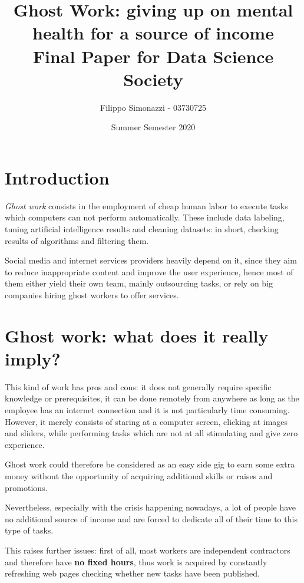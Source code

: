 \documentclass[12pt]{article}
\title{\textbf{Ghost Work: giving up on mental health for a source of income}  \\[0.4em] \smaller{} Final Paper for Data Science Society}
\author{Filippo Simonazzi - 03730725}
\date{Summer Semester 2020}
\begin{document}
	
	\maketitle
	
	\lfoot{}
	\cfoot{}
	\rfoot{\thepage}
	
	\newpage
	\setcounter{tocdepth}{2}
	\tableofcontents
	\newpage

	\section{Introduction}
	\textit{Ghost work} consists in the employment of cheap human labor to execute tasks which computers can not perform automatically. These include data labeling, tuning artificial intelligence results and cleaning datasets: in short, checking results of algorithms and filtering them.
	
	Social media and internet services providers heavily depend on it, since they aim to reduce inappropriate content and improve the user experience, hence most of them either yield their own team, mainly outsourcing tasks, or rely on big companies hiring ghost workers to offer services. 
	
	\section{Ghost work: what does it really imply?}
	This kind of work has pros and cons: it does not generally require specific knowledge or prerequisites, it can be done remotely from anywhere as long as the employee has an internet connection and it is not particularly time consuming. However, it merely consists of staring at a computer screen, clicking at images and sliders, while performing tasks which are not at all stimulating and give zero experience.
	
	Ghost work could therefore be considered as an easy side gig to earn some extra money without the opportunity of acquiring additional skills or raises and promotions.
	
	Nevertheless, especially with the crisis happening nowadays, a lot of people have no additional source of income and are forced to dedicate all of their time to this type of tasks. 
	
	This raises further issues: first of all, most workers are independent contractors and therefore have \textbf{no fixed hours}, thus work is acquired by constantly refreshing web pages checking whether new tasks have been published. 
	
\end{document}
